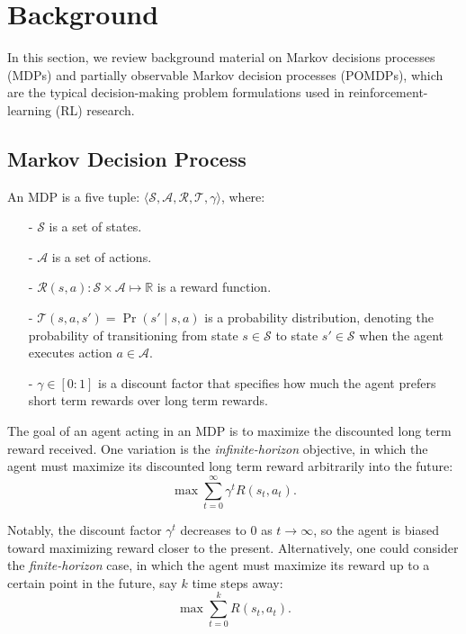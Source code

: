 \documentclass[11pt]{article}
\begin{document}
\section{Background}

In this section, we review background material on Markov decisions processes (MDPs) and partially observable Markov decision processes (POMDPs), which are the typical decision-making problem formulations used in reinforcement-learning (RL) research.

\subsection{Markov Decision Process}

An MDP is a five tuple: $\langle \mathcal{S}, \mathcal{A}, \mathcal{R}, \mathcal{T}, \gamma \rangle$, where:
\begin{itemize}
\item[-] $\mathcal{S}$ is a set of states.
\item[-] $\mathcal{A}$ is a set of actions.
\item[-] $\mathcal{R}(s,a) : \mathcal{S} \times \mathcal{A} \mapsto \mathbb{R}$ is a reward function.
\item[-] $\mathcal{T}(s,a,s') = \Pr(s' \mid s, a)$ is a probability distribution, denoting the probability of transitioning from state $s \in \mathcal{S}$ to state $s' \in \mathcal{S}$ when the agent executes action $a \in \mathcal{A}$.
\item[-] $\gamma \in [0:1]$ is a discount factor that specifies how much the agent prefers short term rewards over long term rewards.
\end{itemize}

The goal of an agent acting in an MDP is to maximize the discounted long term reward received. 
One variation is the {\it infinite-horizon} objective, in which the agent must maximize its discounted long term reward arbitrarily into the future:
\begin{equation}
\max \sum_{t=0}^{\infty} \gamma^t R(s_t,a_t).
\end{equation}

Notably, the discount factor $\gamma^t$ decreases to $0$ as $t \rightarrow \infty$, so the agent is biased toward maximizing reward closer to the present. Alternatively, one could consider the {\it finite-horizon} case, in which the agent must maximize its reward up to a certain point in the future, say $k$ time steps away:
\begin{equation}
\max \sum_{t=0}^{k} R(s_t,a_t).
\end{equation}
\end{document}
